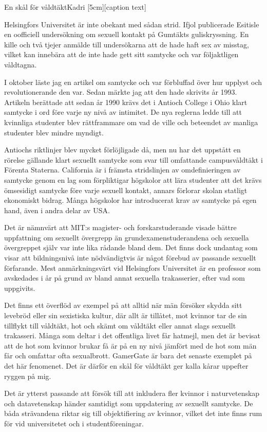 \documentclass{spektraklet}
\begin{document}
\begin{artikel}{En skål för våldtäkt}{Kadri}
[5cm][caption text]

Helsingfors Universitet är inte obekant med sådan strid. Ifjol publicerade Esitisle en oofficiell undersökning om sexuell kontakt på Gumtäkts guliskryssning. En kille och två tjejer anmälde till undersökarna att de hade haft sex av misstag, vilket kan innebära att de inte hade gett sitt samtycke och var följaktligen våldtagna.

I oktober läste jag en artikel om samtycke och var förbluffad över hur upplyst och revolutionerande den var. Sedan märkte jag att den hade skrivits år 1993. Artikeln berättade att sedan år 1990 krävs det i Antioch College i Ohio klart samtycke i ord före varje ny nivå av intimitet. De nya reglerna ledde till att kvinnliga studenter blev rättframmare om vad de ville och beteendet av manliga studenter blev mindre myndigt.

Antiochs riktlinjer blev mycket förlöjligade då, men nu har det uppstått en rörelse gällande klart sexuellt samtycke som svar till omfattande campusvåldtäkt i Förenta Staterna. California är i främsta stridslinjen av omdefinieringen av samtycke genom en lag som förpliktigar högskolor att lära studenter att det krävs ömsesidigt samtycke före varje sexuell kontakt, annars förlorar skolan statligt ekonomiskt bidrag. Många högskolor har introducerat krav av samtycke på egen hand, även  i  andra delar av USA.

Det är nämnvärt att MIT:s magister- och forskarstuderande visade bättre uppfattning om sexuellt övergrepp än grundexamenstuderandena och sexuella övergreppet själv var inte lika rådande bland dem. Det finns dock undantag som visar att bildningsnivå inte nödvändigtvis är något förebud av passande sexuellt förfarande. Mest anmärkningsvärt vid Helsingfors Universitet är en professor som avskedades i år på grund av bland annat sexuella trakasserier, efter vad som uppgivits.

Det finns ett överflöd av exempel på att alltid när män försöker skydda sitt levebröd eller sin sexistiska kultur, där allt är tillåtet, mot kvinnor tar de sin tillflykt till våldtäkt, hot och skämt om våldtäkt eller annat slags sexuellt trakasseri. Många som deltar i det offentliga livet får hatmejl, men det är bevisat att de hot som kvinnor brukar få är på en ny nivå jämfört med de hot som män får och omfattar ofta sexualbrott. GamerGate är bara det senaste exemplet på det här fenomenet. Det är därför en skål för våldtäkt ger kalla kårar uppefter ryggen på mig.

Det är ytterst passande att försök till att inkludera fler kvinnor i naturvetenskap och datavetenskap händer samtidigt som uppdatering av sexuellt samtycke. De båda strävandena riktar sig till objektifiering av kvinnor, vilket det inte finns rum för vid universitetet och i studentföreningar.

\end{artikel}
\end{document}
